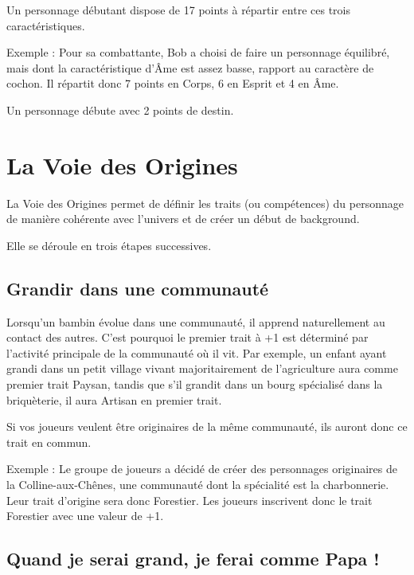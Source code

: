 \documentclass[a4paper,10pt,twoside,twocolumn,openany,bg=print,justified]{dndbook}
\begin{document}
Un personnage débutant dispose de 17 points à répartir entre ces trois caractéristiques.

\begin{quotebox}
Exemple : Pour sa combattante, Bob a choisi de faire un personnage équilibré, mais dont la caractéristique d'Âme est assez basse, rapport au caractère de cochon. Il répartit donc 7 points en Corps, 6 en Esprit et 4 en Âme.
\end{quotebox}

Un personnage débute avec 2 points de destin.

\section{La Voie des Origines}

La Voie des Origines permet de définir les traits (ou compétences) du personnage de manière cohérente avec l'univers et de créer un début de background.

Elle se déroule en trois étapes successives.

\subsection*{Grandir dans une communauté}

Lorsqu'un bambin évolue dans une communauté, il apprend naturellement au contact des autres. C'est pourquoi le premier trait à +1 est déterminé par l'activité principale de la communauté où il vit. Par exemple, un enfant ayant grandi dans un petit village vivant majoritairement de l'agriculture aura comme premier trait Paysan, tandis que s'il grandit dans un bourg spécialisé dans la briquèterie, il aura Artisan en premier trait.

Si vos joueurs veulent être originaires de la même communauté, ils auront donc ce trait en commun.

\begin{quotebox}
Exemple : Le groupe de joueurs a décidé de créer des personnages originaires de la Colline-aux-Chênes, une communauté dont la spécialité est la charbonnerie. Leur trait d'origine sera donc Forestier. Les joueurs inscrivent donc le trait Forestier avec une valeur de +1.
\end{quotebox}

\subsection*{Quand je serai grand, je ferai comme Papa !}
\end{document}

